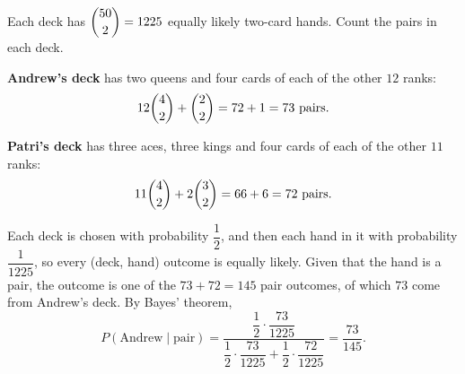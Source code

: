 Each deck has $\dbinom{50}{2}=1225$ equally likely two-card hands. Count the pairs in each deck.

\textbf{Andrew's deck} has two queens and four cards of each of the other $12$ ranks:
\[12\dbinom42+\dbinom22=72+1=73\text{ pairs}.\]

\textbf{Patri's deck} has three aces, three kings and four cards of each of the other $11$ ranks:
\[11\dbinom42+2\dbinom32=66+6=72\text{ pairs}.\]

Each deck is chosen with probability $\dfrac{1}{2}$, and then each hand in it with probability $\dfrac{1}{1225}$, so every (deck, hand) outcome is equally likely. Given that the hand is a pair, the outcome is one of the $73+72=145$ pair outcomes, of which $73$ come from Andrew's deck. By Bayes' theorem,
\[P(\text{Andrew}\mid\text{pair})=\dfrac{\dfrac{1}{2}\cdot\dfrac{73}{1225}}{\dfrac{1}{2}\cdot\dfrac{73}{1225}+\dfrac{1}{2}\cdot\dfrac{72}{1225}}=\boxed{\dfrac{73}{145}}.\]
